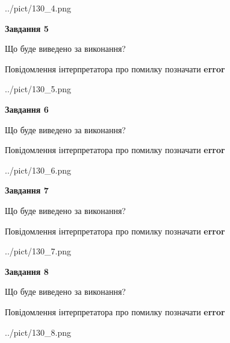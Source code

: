 \documentclass[12pt, ukrainian]{article}
\begin{document}
{\begin{center}
	{../pict/130_4.png}
\end{center}
\newpage

{\begin {center}\textbf{Завдання 5}\end {center}}\par
Що буде виведено за виконання? \par
Повідомлення інтерпретатора про помилку позначати \textbf{error}

\begin{center}
	{../pict/130_5.png}
\end{center}
\newpage

{\begin {center}\textbf{Завдання 6}\end {center}}\par
Що буде виведено за виконання? \par
Повідомлення інтерпретатора про помилку позначати \textbf{error}

\begin{center}
	{../pict/130_6.png}
\end{center}
\newpage

{\begin {center}\textbf{Завдання 7}\end {center}}\par
Що буде виведено за виконання? \par
Повідомлення інтерпретатора про помилку позначати \textbf{error}

\begin{center}
	{../pict/130_7.png}
\end{center}
\newpage

{\begin {center}\textbf{Завдання 8}\end {center}}\par
Що буде виведено за виконання? \par
Повідомлення інтерпретатора про помилку позначати \textbf{error}

\begin{center}
	{../pict/130_8.png}
\end{center}
\newpage

}
\end{document}
